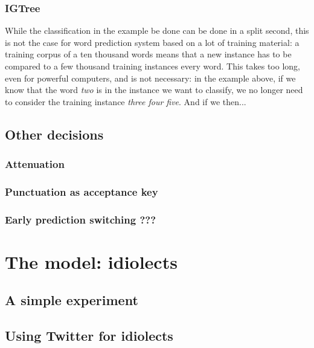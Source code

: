 \documentclass[12pt]{article}
\let\stdsection\section
\renewcommand\section{\newpage\stdsection}
\begin{document}

\subsubsection{IGTree}

While the classification in the example be done can be done in a split second, this is not the case for word prediction system based on a lot of training material: a training corpus of a ten thousand words means that a new instance has to be compared to a few thousand training instances every word. This takes too long, even for powerful computers, and is not necessary: in the example above, if we know that the word \emph{two} is in the instance we want to classify, we no longer need to consider the training instance \emph{three four five}. And if we then...

\subsection{Other decisions}

\subsubsection{Attenuation}

\subsubsection{Punctuation as acceptance key}

\subsubsection{Early prediction switching ???} \label{early}





\section{The model: idiolects} \label{model}

\subsection{A simple experiment}

\subsection{Using Twitter for idiolects}
\end{document}
